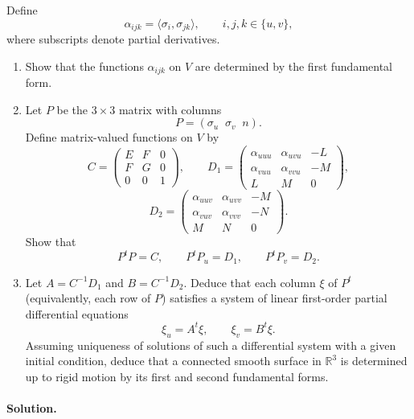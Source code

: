 \documentclass[12pt,a4paper]{article}
\theoremstyle{plain}
\theoremstyle{definition}      %
\begin{document}
	Define
	\[
	\alpha_{ijk}=\langle\sigma_i,\sigma_{jk}\rangle,\qquad i,j,k\in\{u,v\},
	\]
	where subscripts denote partial derivatives.
	
	\begin{enumerate}
		\item[(a)] Show that the functions $\alpha_{ijk}$ on $V$ are determined by the
		first fundamental form.
		
		\item[(b)] Let $P$ be the $3\times3$ matrix with columns
		\[
		P=(\sigma_u\;\;\sigma_v\;\;n).
		\]
		Define matrix-valued functions on $V$ by
		\[
		C=\begin{pmatrix}
			E & F & 0\\[2pt]
			F & G & 0\\[2pt]
			0 & 0 & 1
		\end{pmatrix},\qquad
		D_1=\begin{pmatrix}
			\alpha_{uuu} & \alpha_{uvu} & -L\\[2pt]
			\alpha_{vuu} & \alpha_{vvu} & -M\\[2pt]
			L & M & 0
		\end{pmatrix},
		\]
		\[
		D_2=\begin{pmatrix}
			\alpha_{uuv} & \alpha_{uvv} & -M\\[2pt]
			\alpha_{vuv} & \alpha_{vvv} & -N\\[2pt]
			M & N & 0
		\end{pmatrix}.
		\]
		Show that
		\[
		P^tP=C,\qquad P^tP_u=D_1,\qquad P^tP_v=D_2.
		\]
		
		\item[(c)] Let $A=C^{-1}D_1$ and $B=C^{-1}D_2$.  Deduce that each column
		$\xi$ of $P^t$ (equivalently, each row of $P$) satisfies a system of
		linear first-order partial differential equations
		\[
		\xi_u = A^t\xi,\qquad \xi_v=B^t\xi.
		\]
		Assuming uniqueness of solutions of such a differential system with a given
		initial condition, deduce that a connected smooth surface in $\mathbb{R}^3$ is
		determined up to rigid motion by its first and second fundamental forms.
	\end{enumerate}
	
	\paragraph{Solution.}
	
\end{document}
